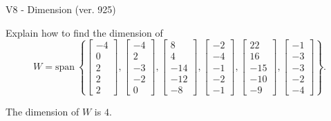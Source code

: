 \begin{exercise}
  \begin{exerciseTitle}V8 - Dimension (ver. 925)\end{exerciseTitle}
  \begin{exerciseStatement}
    Explain how to find the dimension of 
\[W=\mathrm{span}\ \left\{\left[\begin{array}{r}
-4 \\
0 \\
2 \\
2 \\
2
\end{array}\right] , \left[\begin{array}{r}
-4 \\
2 \\
-3 \\
-2 \\
0
\end{array}\right] , \left[\begin{array}{r}
8 \\
4 \\
-14 \\
-12 \\
-8
\end{array}\right] , \left[\begin{array}{r}
-2 \\
-4 \\
-1 \\
-2 \\
-1
\end{array}\right] , \left[\begin{array}{r}
22 \\
16 \\
-15 \\
-10 \\
-9
\end{array}\right] , \left[\begin{array}{r}
-1 \\
-3 \\
-3 \\
-2 \\
-4
\end{array}\right]\right\}.\]



  \end{exerciseStatement}
  \begin{exerciseAnswer}
   The dimension of \(W\) is  \(4\).
  


  \end{exerciseAnswer}
\end{exercise}